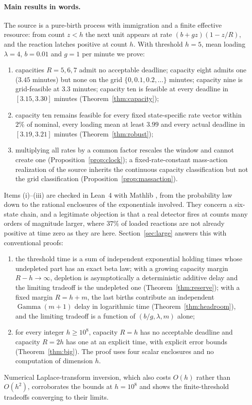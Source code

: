 \documentclass[11pt,a4paper]{article}
\theoremstyle{plain}
\theoremstyle{definition}
\theoremstyle{remark}
\DeclareMathOperator{\Gam}{Gamma}
\begin{document}
\paragraph{Main results in words.} The source is a pure-birth process with immigration and a finite effective resource: from count $z<h$ the next unit appears at rate $(b+gz)(1-z/R)$, and the reaction latches positive at count $h$. With threshold $h=5$, mean loading $\lambda=4$, $b=0.01$ and $g=1$ per minute we prove:
\begin{enumerate}[label=(\roman*)]
\item capacities $R=5,6,7$ admit no acceptable deadline; capacity eight admits one ($3.45$ minutes) but none on the grid $\{0,0.1,0.2,\dots\}$ minutes; capacity nine is grid-feasible at $3.3$ minutes; capacity ten is feasible at every deadline in $[3.15,3.30]$ minutes (Theorem~\ref{thm:capacity});
\item capacity ten remains feasible for every fixed state-specific rate vector within $2\%$ of nominal, every loading mean at least $3.99$ and every actual deadline in $[3.19,3.21]$ minutes (Theorem~\ref{thm:robust});
\item multiplying all rates by a common factor rescales the window and cannot create one (Proposition~\ref{prop:clock}); a fixed-rate-constant mass-action realization of the source inherits the continuous capacity classification but not the grid classification (Proposition~\ref{prop:massaction}).
\end{enumerate}
Items (i)--(iii) are checked in Lean~4 with Mathlib \citep{demoura2021,mathlib2020}, from the probability law down to the rational enclosures of the exponentials involved. They concern a six-state chain, and a legitimate objection is that a real detector fires at counts many orders of magnitude larger, where $37\%$ of loaded reactions are not already positive at time zero as they are here. Section~\ref{sec:large} answers this with conventional proofs:
\begin{enumerate}[label=(\roman*),resume]
\item the threshold time is a sum of independent exponential holding times whose undepleted part has an exact beta law; with a growing capacity margin $R-h\to\infty$, depletion is asymptotically a deterministic additive delay and the limiting tradeoff is the undepleted one (Theorem~\ref{thm:reserve}); with a fixed margin $R=h+m$, the last births contribute an independent $\Gam(m+1)$ delay in logarithmic time (Theorem~\ref{thm:headroom}), and the limiting tradeoff is a function of $(b/g,\lambda,m)$ alone;
\item for every integer $h\ge10^{8}$, capacity $R=h$ has no acceptable deadline and capacity $R=2h$ has one at an explicit time, with explicit error bounds (Theorem~\ref{thm:big}). The proof uses four scalar enclosures and no computation of dimension $h$.
\end{enumerate}
Numerical Laplace-transform inversion, which also costs $O(h)$ rather than $O(h^2)$, corroborates the bounds at $h=10^{8}$ and shows the finite-threshold tradeoffs converging to their limits.
\end{document}
